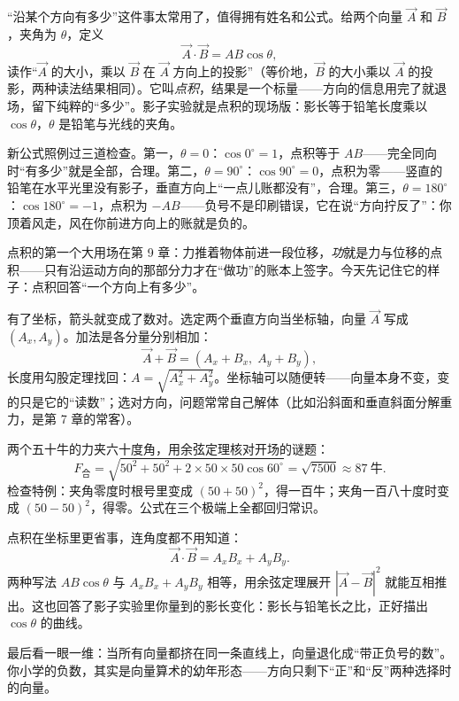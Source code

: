 \begin{mainline}
“沿某个方向有多少”这件事太常用了，值得拥有姓名和公式。给两个向量 \(\vec{A}\) 和 \(\vec{B}\)，夹角为 \(\theta\)，定义
\[
  \vec{A}\cdot\vec{B} = AB\cos\theta ,
\]
读作“\(\vec{A}\) 的大小，乘以 \(\vec{B}\) 在 \(\vec{A}\) 方向上的投影”（等价地，\(\vec{B}\) 的大小乘以 \(\vec{A}\) 的投影，两种读法结果相同）。它叫\emph{点积}，结果是一个标量——方向的信息用完了就退场，留下纯粹的“多少”。影子实验就是点积的现场版：影长等于铅笔长度乘以 \(\cos\theta\)，\(\theta\) 是铅笔与光线的夹角。

新公式照例过三道检查。第一，\(\theta=0\)：\(\cos 0^{\circ}=1\)，点积等于 \(AB\)——完全同向时“有多少”就是全部，合理。第二，\(\theta=90^{\circ}\)：\(\cos 90^{\circ}=0\)，点积为零——竖直的铅笔在水平光里没有影子，垂直方向上“一点儿账都没有”，合理。第三，\(\theta=180^{\circ}\)：\(\cos 180^{\circ}=-1\)，点积为 \(-AB\)——负号不是印刷错误，它在说“方向拧反了”：你顶着风走，风在你前进方向上的账就是负的。

点积的第一个大用场在第 9 章：力推着物体前进一段位移，\emph{功}就是力与位移的点积——只有沿运动方向的那部分力才在“做功”的账本上签字。今天先记住它的样子：点积回答“一个方向上有多少”。
\end{mainline}

\begin{mathbridge}
有了坐标，箭头就变成了数对。选定两个垂直方向当坐标轴，向量 \(\vec{A}\) 写成 \((A_x,A_y)\)。加法是各分量分别相加：
\[
  \vec{A}+\vec{B} = (A_x+B_x,\;A_y+B_y),
\]
长度用勾股定理找回：\(A=\sqrt{A_x^2+A_y^2}\)。坐标轴可以随便转——向量本身不变，变的只是它的“读数”；选对方向，问题常常自己解体（比如沿斜面和垂直斜面分解重力，是第 7 章的常客）。

两个五十牛的力夹六十度角，用余弦定理核对开场的谜题：
\[
  F_{\text{合}}=\sqrt{50^{2}+50^{2}+2\times 50\times 50\cos 60^{\circ}}
  =\sqrt{7500}\approx 87\ \text{牛}.
\]
检查特例：夹角零度时根号里变成 \((50+50)^2\)，得一百牛；夹角一百八十度时变成 \((50-50)^2\)，得零。公式在三个极端上全都回归常识。

点积在坐标里更省事，连角度都不用知道：
\[
  \vec{A}\cdot\vec{B} = A_xB_x + A_yB_y .
\]
两种写法 \(AB\cos\theta\) 与 \(A_xB_x+A_yB_y\) 相等，用余弦定理展开 \(|\vec{A}-\vec{B}|^2\) 就能互相推出。这也回答了影子实验里你量到的影长变化：影长与铅笔长之比，正好描出 \(\cos\theta\) 的曲线。

最后看一眼一维：当所有向量都挤在同一条直线上，向量退化成“带正负号的数”。你小学的负数，其实是向量算术的幼年形态——方向只剩下“正”和“反”两种选择时的向量。
\end{mathbridge}

